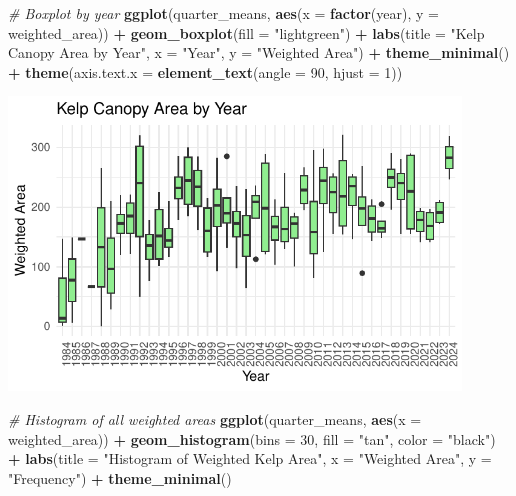 \documentclass[
  british,
  10pt,
]{article}
\newenvironment{Shaded}{\begin{snugshade}}{\end{snugshade}}
\newcommand{\AttributeTok}[1]{\textcolor[rgb]{0.13,0.29,0.53}{#1}}
\newcommand{\CommentTok}[1]{\textcolor[rgb]{0.56,0.35,0.01}{\textit{#1}}}
\newcommand{\DecValTok}[1]{\textcolor[rgb]{0.00,0.00,0.81}{#1}}
\newcommand{\FunctionTok}[1]{\textcolor[rgb]{0.13,0.29,0.53}{\textbf{#1}}}
\newcommand{\NormalTok}[1]{#1}
\newcommand{\SpecialCharTok}[1]{\textcolor[rgb]{0.81,0.36,0.00}{\textbf{#1}}}
\newcommand{\StringTok}[1]{\textcolor[rgb]{0.31,0.60,0.02}{#1}}
\begin{document}
\begin{Shaded}
\begin{Highlighting}[]
\CommentTok{\# Boxplot by year}
\FunctionTok{ggplot}\NormalTok{(quarter\_means, }\FunctionTok{aes}\NormalTok{(}\AttributeTok{x =} \FunctionTok{factor}\NormalTok{(year), }\AttributeTok{y =}\NormalTok{ weighted\_area)) }\SpecialCharTok{+}
  \FunctionTok{geom\_boxplot}\NormalTok{(}\AttributeTok{fill =} \StringTok{"lightgreen"}\NormalTok{) }\SpecialCharTok{+}
  \FunctionTok{labs}\NormalTok{(}\AttributeTok{title =} \StringTok{"Kelp Canopy Area by Year"}\NormalTok{,}
       \AttributeTok{x =} \StringTok{"Year"}\NormalTok{, }\AttributeTok{y =} \StringTok{"Weighted Area"}\NormalTok{) }\SpecialCharTok{+}
  \FunctionTok{theme\_minimal}\NormalTok{() }\SpecialCharTok{+}
  \FunctionTok{theme}\NormalTok{(}\AttributeTok{axis.text.x =} \FunctionTok{element\_text}\NormalTok{(}\AttributeTok{angle =} \DecValTok{90}\NormalTok{, }\AttributeTok{hjust =} \DecValTok{1}\NormalTok{))}
\end{Highlighting}
\end{Shaded}

\begin{center}
\includegraphics[width=12cm,height=\textheight,keepaspectratio]{BCB744_Biostats_Prac_Exam_2025_files/figure-pdf/chunk9-2.pdf}
\end{center}

\begin{Shaded}
\begin{Highlighting}[]
\CommentTok{\# Histogram of all weighted areas}
\FunctionTok{ggplot}\NormalTok{(quarter\_means, }\FunctionTok{aes}\NormalTok{(}\AttributeTok{x =}\NormalTok{ weighted\_area)) }\SpecialCharTok{+}
  \FunctionTok{geom\_histogram}\NormalTok{(}\AttributeTok{bins =} \DecValTok{30}\NormalTok{, }\AttributeTok{fill =} \StringTok{"tan"}\NormalTok{, }\AttributeTok{color =} \StringTok{"black"}\NormalTok{) }\SpecialCharTok{+}
  \FunctionTok{labs}\NormalTok{(}\AttributeTok{title =} \StringTok{"Histogram of Weighted Kelp Area"}\NormalTok{,}
       \AttributeTok{x =} \StringTok{"Weighted Area"}\NormalTok{, }\AttributeTok{y =} \StringTok{"Frequency"}\NormalTok{) }\SpecialCharTok{+}
  \FunctionTok{theme\_minimal}\NormalTok{()}
\end{Highlighting}
\end{Shaded}
\end{document}
